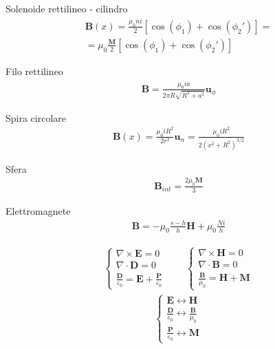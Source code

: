\documentclass[10pt, twocolumn, a4paper, fleqn]{article}
\def\bb{\mathbf}
\def\grad{\nabla}
\def\rot{\grad\times}
\def\div{\grad\cdot}
\def\e{\varepsilon}
\def\E{\bb{E}}
\def\P{\bb{P}}
\def\D{\bb{D}}
\def\B{\bb{B}}
\def\H{\bb{H}}
\def\M{\bb{M}}
\def\u{\bb{u}}
\def\un{\bb{u}_n}
\begin{document}
Solenoide rettilineo - cilindro
\begin{equation*}\begin{split}
\B\left(x\right)=\frac{\mu_0 ni}{2}\left[\cos{\left(\phi_1\right)}+\cos{\left(\phi_2'\right)}\right]=\\
=\mu_0\frac{\M}{2}\left[\cos{\left(\phi_1\right)}+\cos{\left(\phi_2'\right)}\right]
\end{split}\end{equation*}

Filo rettilineo
\begin{equation*}\begin{split}
\B=\frac{\mu_0 ia}{2\pi R\sqrt{R^2+a^2}}\u_{\phi}
\end{split}\end{equation*}

Spira circolare
\begin{equation*}\begin{split}
\B\left(x\right)=\frac{\mu_0 iR^2}{2r^3}\un=\frac{\mu_0 iR^2}{2\left(x^2+R^2\right)^{3/2}}
\end{split}\end{equation*}

Sfera
\begin{equation*}\begin{split}
\B_{int}=\frac{2\mu_0\M}{3}
\end{split}\end{equation*}

Elettromagnete
\begin{equation*}\begin{split}
\B=-\mu_0\frac{s-h}{h}\H+\mu_0\frac{Ni}{h}
\end{split}\end{equation*}

\begin{equation*}\begin{split}
\begin{cases}
\rot\E=0\\
\div\D=0\\
\frac{\D}{\e_0}=\E+\frac{\P}{\e_0}
\end{cases}
\qquad
\begin{cases}
\rot\H=0\\
\div\B=0\\
\frac{\B}{\mu_0}=\H+\M
\end{cases}
\end{split}\end{equation*}
\begin{equation*}\begin{split}
\begin{cases}
\E\leftrightarrow\H\\
\frac{\D}{\e_0}\leftrightarrow\frac{\B}{\mu_0}\\
\frac{\P}{\e_0}\leftrightarrow \M
\end{cases}
\end{split}\end{equation*}
\end{document}
